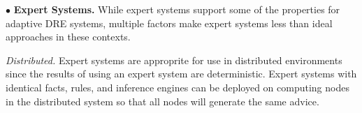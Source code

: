 \documentclass[conference]{IEEEtran}
\begin{document}
%
%

$\bullet$ {\bf Expert Systems.} While expert systems support some of the properties for adaptive DRE systems, multiple factors make expert systems less than ideal approaches in these contexts.

\emph{Distributed.} Expert systems are approprite for use in distributed environments since the results of using an expert system are deterministic. Expert systems with identical facts, rules, and inference engines can be deployed on computing nodes in the distributed system so that all nodes will generate the same advice. 
\end{document}
